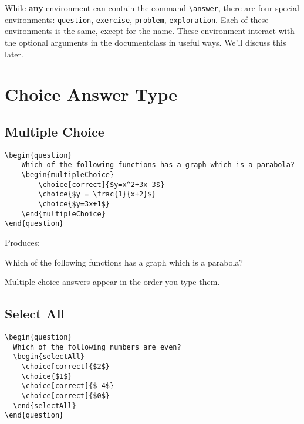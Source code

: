 \documentclass{ximera}
\begin{document}
While \textbf{any} environment can contain the command \verb|\answer|,
there are four special environments: \verb|question|, \verb|exercise|,
\verb|problem|, \verb|exploration|. Each of these environments is the
same, except for the name. These environment interact with the
optional arguments in the documentclass in useful ways. We'll discuss
this later.





\section{Choice Answer Type}

\subsection{Multiple Choice}

\begin{verbatim}
\begin{question}
	Which of the following functions has a graph which is a parabola?
	\begin{multipleChoice}
		\choice[correct]{$y=x^2+3x-3$}
		\choice{$y = \frac{1}{x+2}$}
		\choice{$y=3x+1$}
	\end{multipleChoice}
\end{question}
\end{verbatim}

Produces:

\begin{question}
  Which of the following functions has a graph which is a parabola?
  \begin{multipleChoice}
  \end{multipleChoice}
\end{question}

\begin{remark}
  Multiple choice answers appear in the order you type them. 
\end{remark}


\subsection{Select All}

\begin{verbatim}
\begin{question}
  Which of the following numbers are even?
  \begin{selectAll}
    \choice[correct]{$2$}
    \choice{$1$}
    \choice[correct]{$-4$}
    \choice[correct]{$0$}
  \end{selectAll}
\end{question}
\end{verbatim}
\end{document}
